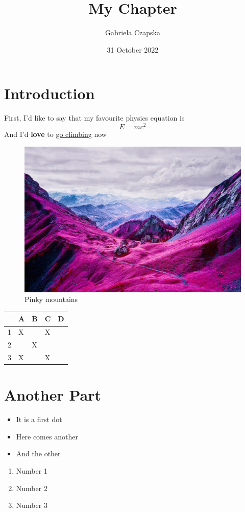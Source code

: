 \documentclass{article}
\title{My Chapter}
\author
{Gabriela Czapska}
\date{31 October 2022}
\begin{document}
\maketitle
\tableofcontents



\section{Introduction}
First, I'd like to say that my favourite physics equation is 
\[E=mc^2\]
And I'd \textbf{love} to \underline{go climbing} now

\begin{figure}[h!]
\includegraphics[width=\linewidth]{Pictures/mountains.jpg}
\caption{Pinky mountains}
  \label{fig:mountains}
\end{figure}


\begin{table}[]
\begin{tabular}{|l|l|l|l|l|}
\hline
\rowcolor[HTML]{DAE8FC} 
                          & A & B & C & D \\ \hline
\cellcolor[HTML]{DAE8FC}1 & X &   & X &   \\ \hline
\cellcolor[HTML]{DAE8FC}2 &   & X &   &   \\ \hline
\cellcolor[HTML]{DAE8FC}3 & X &   & X &   \\ \hline
\end{tabular}
\end{table}

\section{Another Part}
\centering

\begin{itemize}
  \item It is a first dot
  \item Here comes another
  \item And the other
\end{itemize}
\begin{enumerate}
  \item Number 1
  \item Number 2
  \item Number 3
\end{enumerate}
\end{document}
